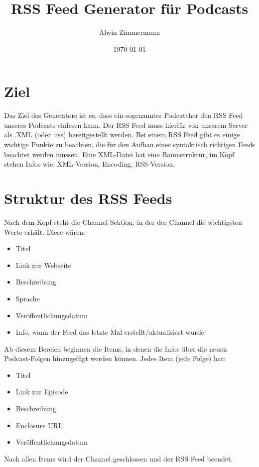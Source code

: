 \documentclass[a4paper,12pt]{article}
\title{RSS Feed Generator für Podcasts}
\author{Alwin Zimmermann}
\date{\today}
\begin{document}
\maketitle

\section{Ziel}
Das Ziel des Generators ist es, dass ein sogenannter Podcatcher den RSS Feed unseres Podcasts einlesen kann. Der RSS Feed muss hierfür von unserem Server als .XML (oder .rss) bereitgestellt werden. Bei einem RSS Feed gibt es einige wichtige Punkte zu beachten, die für den Aufbau eines syntaktisch richtigen Feeds beachtet werden müssen. Eine XML-Datei hat eine Baumstruktur, im Kopf stehen Infos wie: XML-Version, Encoding, RSS-Version.

\section{Struktur des RSS Feeds}
Nach dem Kopf steht die Channel-Sektion, in der der Channel die wichtigsten Werte erhält. Diese wären:
\begin{itemize}
    \item Titel
    \item Link zur Webseite
    \item Beschreibung
    \item Sprache
    \item Veröffentlichungsdatum
    \item Info, wann der Feed das letzte Mal erstellt/aktualisiert wurde
\end{itemize}
\newpage
Ab diesem Bereich beginnen die Items, in denen die Infos über die neuen Podcast-Folgen hinzugefügt werden können. Jedes Item (jede Folge) hat:
\begin{itemize}
    \item Titel
    \item Link zur Episode
    \item Beschreibung
    \item Enclosure URL
    \item Veröffentlichungsdatum
\end{itemize}
Nach allen Items wird der Channel geschlossen und der RSS Feed beendet.
\end{document}
